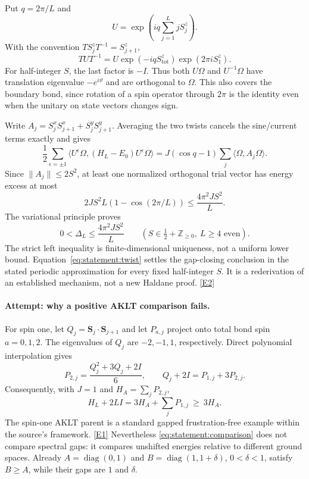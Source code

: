 \documentclass[11pt,a4paper]{article}
\newcommand{\Z}{\mathbb{Z}}
\newcommand{\eref}[2]{\hyperlink{extra:#1:#2}{[E#2]}}
\numberwithin{equation}{section}
\begin{document}
Put $q=2\pi/L$ and
\[
 U=\exp\left(iq\sum_{j=1}^L jS_j^z\right).
\]
With the convention $TS_j^zT^{-1}=S_{j+1}^z$,
\[
 TUT^{-1}=U\exp(-iqS_{\mathrm{tot}}^z)\exp(2\pi iS_1^z).
\]
For half-integer $S$, the last factor is $-I$. Thus both $U\Omega$ and
$U^{-1}\Omega$ have translation eigenvalue $-e^{i\vartheta}$ and are
orthogonal to $\Omega$. This also covers the boundary bond, since rotation
of a spin operator through $2\pi$ is the identity even when the unitary on
state vectors changes sign.

Write $A_j=S_j^xS_{j+1}^x+S_j^yS_{j+1}^y$. Averaging the two twists cancels
the sine/current terms exactly and gives
\[
 \frac12\sum_{\epsilon=\pm1}
 \langle U^\epsilon\Omega,(H_L-E_0)U^\epsilon\Omega\rangle
 =J(\cos q-1)\sum_j\langle\Omega,A_j\Omega\rangle.
\]
Since $\|A_j\|\leq2S^2$, at least one normalized orthogonal trial vector has
energy excess at most
\[
 2JS^2L(1-\cos(2\pi/L))\leq\frac{4\pi^2JS^2}{L}.
\]
The variational principle proves
\begin{equation}\label{eq:statement:twist}
 0<\Delta_L\leq\frac{4\pi^2JS^2}{L}
 \qquad(S\in\tfrac12+\Z_{\geq0},\ L\geq4\text{ even}).
\end{equation}
The strict left inequality is finite-dimensional uniqueness, not a uniform
lower bound. Equation~\eqref{eq:statement:twist} settles the gap-closing conclusion
in the stated periodic approximation for every fixed half-integer $S$.
It is a rederivation of an established mechanism, not a new Haldane proof.
\eref{statement}{2}

\paragraph{Attempt: why a positive AKLT comparison fails.}
For spin one, let $Q_j=\mathbf S_j\cdot\mathbf S_{j+1}$ and let $P_{a,j}$
project onto total bond spin $a=0,1,2$. The eigenvalues of $Q_j$ are
$-2,-1,1$, respectively. Direct polynomial interpolation gives
\[
 P_{2,j}=\frac{Q_j^2+3Q_j+2I}{6},\qquad
 Q_j+2I=P_{1,j}+3P_{2,j}.
\]
Consequently, with $J=1$ and $H_A=\sum_jP_{2,j}$,
\begin{equation}\label{eq:statement:comparison}
 H_L+2LI=3H_A+\sum_jP_{1,j}\ \geq\ 3H_A.
\end{equation}
The spin-one AKLT parent is a standard gapped frustration-free example
within the source's framework. \eref{statement}{1}
Nevertheless \eqref{eq:statement:comparison} does not compare spectral gaps:
it compares unshifted energies relative to different ground spaces.
Already $A=\operatorname{diag}(0,1)$ and
$B=\operatorname{diag}(1,1+\delta)$, $0<\delta<1$, satisfy $B\geq A$,
while their gaps are $1$ and $\delta$.
\end{document}
